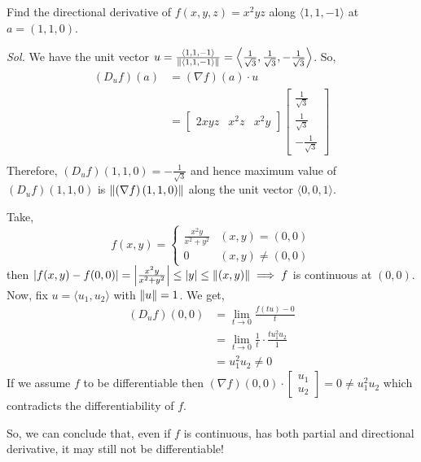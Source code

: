 \documentclass[Analysis-3]{subfiles}
\begin{document}
\begin{Eg}{}{}
  Find the directional derivative of $ f(x,y,z) = x^2yz $ along $ \langle 1,1,-1 \rangle $ at $ a = (1,1,0) $.

  \textit{Sol.} We have the unit vector $ u = \frac{\langle 1,1,-1 \rangle}{\norm{\langle 1,1,-1 \rangle}} = \left\langle \frac{1}{\sqrt{3}}, \frac{1}{\sqrt{3}}, -\frac{1}{\sqrt{3}} \right\rangle $. So,
  \begin{align*}
    \left( D_uf \right)\left( a \right) & = \left( \nabla f\right)\left( a \right)\cdot u                                                   \\
                                        & = \begin{bmatrix} 2xyz & x^2z & x^2y \end{bmatrix}
    \begin{bmatrix} \frac{1}{\sqrt{3}} \\ \frac{1}{\sqrt{3}} \\ -\frac{1}{\sqrt{3}} \end{bmatrix} \\
  \end{align*}
  Therefore, $ \left( D_uf \right)(1,1,0) = -\frac{1}{\sqrt{3}} $ and hence maximum value of $ \left( D_uf \right)(1,1,0) $ is $ \norm{\left( \nabla f\right)(1,1,0)} $ along the unit vector $ \langle 0,0,1 \rangle $.
\end{Eg}

\begin{Eg}{}{}
  Take,
  \[ f(x,y) = \begin{cases}
      \frac{x^2y}{x^2+y^2} & (x,y) = (0,0)     \\
      0                    & (x,y) \not= (0,0)
    \end{cases} \]
  then $ \left| f(x,y) - f(0,0) \right| = \left| \frac{x^2y}{x^2+y^2} \right| \leq |y| \leq \norm{(x,y)} \implies f $ is continuous at $ (0,0) $. Now, fix $ u = \langle u_1, u_2 \rangle $ with $ \norm{u} = 1 $. We get,
  \begin{align*}
    \left( D_uf \right)(0,0) & = \lim_{t\to 0} \frac{f(tu)- 0}{t}                        \\
                             & =\lim_{t\to 0} \frac{1}{t}\cdot\frac{tu_1^2u_2}{1}        \\
                             & = u_1^2u_2 \not= 0 \tag{Because, $ u $ is an unit vector}
  \end{align*}
  If we assume $ f $ to be differentiable then $ \left( \nabla f \right)(0,0) \cdot \begin{bmatrix} u_1 \\ u_2  \end{bmatrix} = 0 \not= u_1^2u_2 $ which contradicts the differentiability of $ f $.
\end{Eg}

So, we can conclude that, even if $ f $ is continuous, has both partial and directional derivative, it may still not be differentiable!
\end{document}
